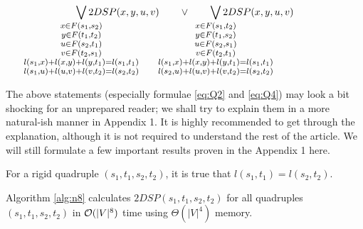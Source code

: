 \begin{theorem}
\begin{enumerate}
\begin{align}
        \smashoperator{\bigvee_{
        \large \substack{
            x \in F(s_1, s_2)\\ 
            y \in F(t_1, t_2)\\ 
            u \in F(s_2, t_1)\\ 
            v \in F(t_2, s_1)\\ 
            l(s_1, x) + l(x, y) + l(y, t_1) = l(s_1, t_1)\\ 
            l(s_1, u) + l(u, v) + l(v, t_2) = l(s_2, t_2)
        }
        }} 2DSP(x, y, u, v)
        \quad\quad\vee\quad\quad
        \smashoperator{\bigvee_{
        \large \substack{
            x \in F(s_1, t_2)\\ 
            y \in F(t_1, s_2)\\ 
            u \in F(s_2, s_1)\\ 
            v \in F(t_2, t_1)\\ 
            l(s_1, x) + l(x, y) + l(y, t_1) = l(s_1, t_1)\\ 
            l(s_2, u) + l(u, v) + l(v, t_2) = l(s_2, t_2)
        }
        }} 2DSP(x, y, u, v) \label{eq:Q4} \\
\end{align}
\end{enumerate}
\end{theorem}

The above statements (especially formulae \eqref{eq:Q2} and \eqref{eq:Q4}) may look a bit shocking for an unprepared reader; we shall try to explain them in a more natural-ish manner in Appendix 1. It is highly recommended to get through the explanation, although it is not required to understand the rest of the article. We will still formulate a few important results proven in the Appendix 1 here.

\begin{proposition} \label{eql}
For a rigid quadruple $(s_1, t_1, s_2, t_2)$, it is true that $l(s_1, t_1) = l(s_2, t_2)$.
\end{proposition}

\begin{theorem} 
Algorithm \ref{alg:n8} calculates $2DSP(s_1, t_1, s_2, t_2)$ for all quadruples $(s_1, t_1, s_2, t_2)$ in $\mathcal{O}(|V|^8)$ time using $\Theta(|V|^4)$ memory. 
\end{theorem}

